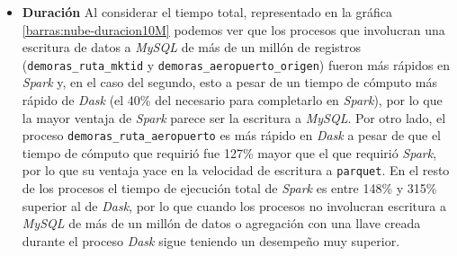 \begin{itemize}
	\item \textbf{Duración} Al considerar el tiempo total, representado en la gráfica \ref{barras:nube-duracion10M} podemos ver que los procesos que involucran una escritura de datos a \textit{MySQL} de más de un millón de registros (\texttt{demoras\_ruta\_mktid} y \texttt{demoras\_aeropuerto\_origen}) fueron más rápidos en \textit{Spark} y, en el caso del segundo, esto a pesar de un tiempo de cómputo más rápido de \textit{Dask} (el 40\% del necesario para completarlo en \textit{Spark}), por lo que la mayor ventaja de \textit{Spark} parece ser la escritura a \textit{MySQL}. Por otro lado, el proceso \texttt{demoras\_ruta\_aeropuerto} es más rápido en \textit{Dask} a pesar de que el tiempo de cómputo que requirió fue 127\% mayor que el que requirió \textit{Spark}, por lo que su ventaja yace en la velocidad de escritura a \texttt{parquet}. En el resto de los procesos el tiempo de ejecución total de \textit{Spark} es entre 148\% y 315\% superior al de \textit{Dask}, por lo que cuando los procesos no involucran escritura a \textit{MySQL} de más de un millón de datos o agregación con una llave creada durante el proceso \textit{Dask} sigue teniendo un desempeño muy superior.
	
\end{itemize}

